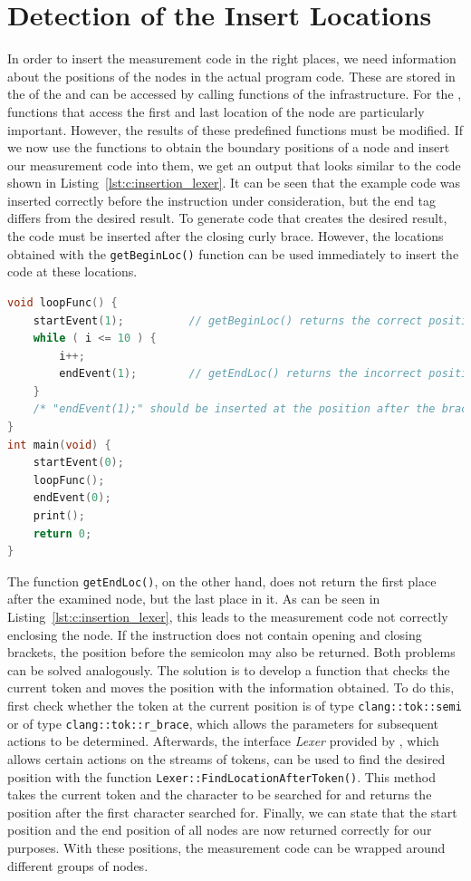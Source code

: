 \section{Detection of the Insert Locations}
In order to insert the measurement code in the right places, we need information about the positions of the nodes in the actual program code. These are stored in the \SOUMNG of the \astsmall and can be accessed by calling functions of the \CLANG infrastructure. For the \TOOL, functions that access the first and last location of the node are particularly important. However, the results of these predefined functions must be modified. If we now use the functions to obtain the boundary positions of a node and insert our measurement code into them, we get an output that looks similar to the code shown in Listing~\ref{lst:c:insertion_lexer}. It can be seen that the example code was inserted correctly before the instruction under consideration, but the end tag differs from the desired result. To generate code that creates the desired result, the code must be inserted after the closing curly brace. However, the locations obtained with the \lstinline{getBeginLoc()} function can be used immediately to insert the code at these locations. 

\begin{lstlisting}[float, language=C++, caption=Wrong Insertion Position When Using End Location of Node., label=lst:c:insertion_lexer]
void loopFunc() {
    startEvent(1);          // getBeginLoc() returns the correct position
    while ( i <= 10 ) { 
        i++; 
        endEvent(1);        // getEndLoc() returns the incorrect position
    }
    /* "endEvent(1);" should be inserted at the position after the brace */
}
int main(void) {
    startEvent(0);
    loopFunc();
    endEvent(0);
    print();
    return 0;
}
\end{lstlisting}

The function \lstinline{getEndLoc()}, on the other hand, does not return the first place after the examined node, but the last place in it. As can be seen in Listing~\ref{lst:c:insertion_lexer}, this leads to the measurement code not correctly enclosing the node. If the instruction does not contain opening and closing brackets, the position before the semicolon may also be returned. Both problems can be solved analogously. The solution is to develop a function that checks the current token and moves the position with the information obtained. To do this, first check whether the token at the current position is of type \lstinline{clang::tok::semi} or of type \lstinline{clang::tok::r_brace}, which allows the parameters for subsequent actions to be determined. Afterwards, the interface \emph{Lexer} provided by \CLANG, which allows certain actions on the streams of tokens, can be used to find the desired position with the function \lstinline{Lexer::FindLocationAfterToken()}. This method takes the current token and the character to be searched for and returns the position after the first character searched for. Finally, we can state that the start position and the end position of all nodes are now returned correctly for our purposes. With these positions, the measurement code can be wrapped around different groups of nodes. 

